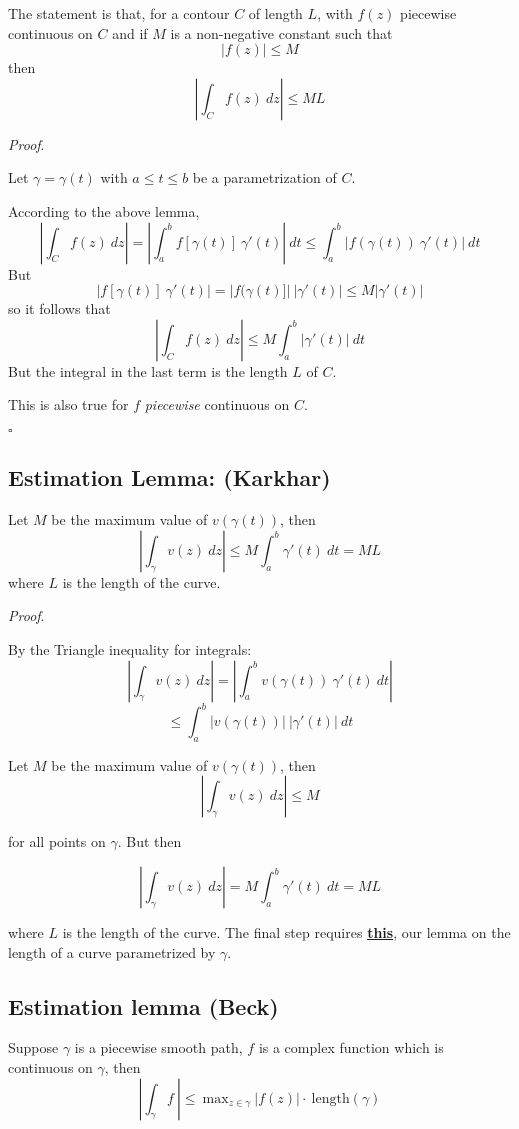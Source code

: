 \documentclass[11pt, oneside]{article}
\begin{document}
\label{sec:estimation_lemma}

The statement is that, for a contour $C$ of length $L$, with $f(z)$ piecewise continuous on $C$ and if $M$ is a non-negative constant such that
\[ |f(z)| \le M \]
then 
\[ |\int_C f(z) \ dz | \le ML \]

\emph{Proof}.

Let $\gamma = \gamma(t)$ with $a \le t \le b$ be a parametrization of $C$.  

According to the above lemma,
\[ |\int_C f(z) \ dz |  = |\int_a^b f[\gamma(t)] \ \gamma'(t)| \ dt  \le \int_a^b |f(\gamma(t)) \ \gamma'(t)| \ dt \]
But 
\[ |f[\gamma(t)] \ \gamma'(t)|  = |f(\gamma(t)]| \ |\gamma'(t)|  \le M |\gamma'(t)| \]
so it follows that
\[ |\int_C f(z) \ dz | \le M \int_a^b |\gamma'(t)| \ dt \]
But the integral in the last term is the length $L$ of $C$.

This is also true for $f$ \emph{piecewise} continuous on $C$.

$\square$

\subsection*{Estimation Lemma:  (Karkhar)}

Let $M$ be the maximum value of $v(\gamma(t))$, then
\[ | \int_\gamma v(z) \ dz | \le M \int_a^b \gamma'(t) \ dt = ML \]
where $L$ is the length of the curve.

\emph{Proof}.

By the Triangle inequality for integrals:
\[ | \int_\gamma v(z) \ dz | = | \int_a^b v(\gamma(t)) \ \gamma'(t) \ dt | \]
\[ \le \int_a^b |v(\gamma(t))| \ |\gamma'(t)| \ dt \]

Let $M$ be the maximum value of $v(\gamma(t))$, then
\[ | \int_\gamma v(z) \ dz | \le M \]

for all points on $\gamma$.  But then

\[ | \int_\gamma v(z) \ dz | = M \int_a^b \gamma'(t) \ dt = ML \]

where $L$ is the length of the curve.  The final step requires \hyperref[sec:length_of_curve]{\textbf{this}}, our lemma on the length of a curve parametrized by $\gamma$.

\subsection*{Estimation lemma (Beck)}

Suppose $\gamma$ is a piecewise smooth path, $f$ is a complex function which is continuous on $\gamma$, then
\[ | \int_\gamma f \ | \le \  \text{max}_{z \in \gamma} \ |f(z)| \cdot \ \text{length}(\gamma)   \]
\end{document}
